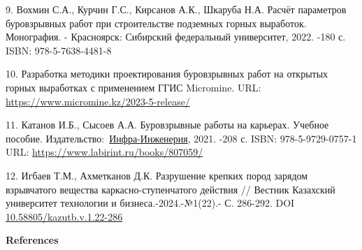 \begin{references}
9. Вохмин С.А., Курчин Г.С., Кирсанов А.К., Шкаруба Н.А. Расчёт
  параметров буровзрывных работ при строительстве подземных горных
  выработок. Монография. - Красноярск: Сибирский федеральный
  университет, 2022. -180 с. ISBN: 978-5-7638-4481-8

10. Разработка методики проектирования буровзрывных работ на открытых
  горных выработках с применением ГГИС Micromine. URL:
  \url{https://www.micromine.kz/2023-5-release/}

11. Катанов И.Б., Сысоев А.А. Буровзрывные работы на карьерах. Учебное
  пособие.   Издательство:~\href{https://www.labirint.ru/pubhouse/2357/}{Инфра-Инженерия},
  2021. -208 с. ISBN: 978-5-9729-0757-1 URL:   \url{https://www.labirint.ru/books/807059/}

12. Игбаев Т.М., Ахметканов Д.К. Разрушение крепких пород зарядом
взрывчатого вещества каркасно-ступенчатого действия // Вестник Казахский
университет технологии и бизнеса.-2024.-№1(22).- С. 286-292. DOI
\href{https://doi.org/10.58805/kazutb.v.1.22-286}{10.58805/kazutb.v.1.22-286}

\end{references}

\begin{center}
{\bfseries References}
\end{center}

